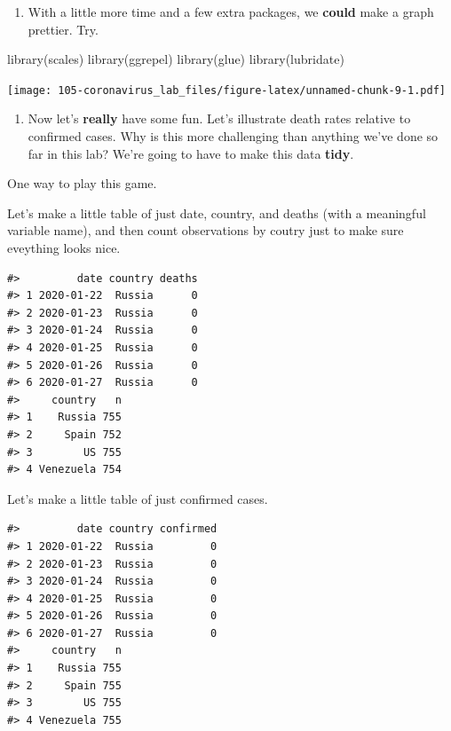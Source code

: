 \documentclass[
]{book}
\newenvironment{Shaded}{\begin{snugshade}}{\end{snugshade}}
\newcommand{\FunctionTok}[1]{\textcolor[rgb]{0.00,0.00,0.00}{#1}}
\newcommand{\NormalTok}[1]{#1}
\providecommand{\tightlist}{%
  \setlength{\itemsep}{0pt}\setlength{\parskip}{0pt}}
\begin{document}
\begin{enumerate}
\def\labelenumi{\arabic{enumi}.}
\setcounter{enumi}{5}
\tightlist
\item
  With a little more time and a few extra packages, we \textbf{could} make a graph prettier. Try.
\end{enumerate}

\begin{Shaded}
\begin{Highlighting}[]
\FunctionTok{library}\NormalTok{(scales)}
\FunctionTok{library}\NormalTok{(ggrepel)}
\FunctionTok{library}\NormalTok{(glue)}
\FunctionTok{library}\NormalTok{(lubridate)}
\end{Highlighting}
\end{Shaded}

\texttt{[image: 105-coronavirus\_lab\_files/figure-latex/unnamed-chunk-9-1.pdf]}

\begin{enumerate}
\def\labelenumi{\arabic{enumi}.}
\setcounter{enumi}{6}
\tightlist
\item
  Now let's \textbf{really} have some fun. Let's illustrate death rates relative to confirmed cases. Why is this more challenging than anything we've done so far in this lab? We're going to have to make this data \textbf{tidy}.
\end{enumerate}

One way to play this game.

Let's make a little table of just date, country, and deaths (with a meaningful variable name), and then count observations by coutry just to make sure eveything looks nice.

\begin{verbatim}
#>         date country deaths
#> 1 2020-01-22  Russia      0
#> 2 2020-01-23  Russia      0
#> 3 2020-01-24  Russia      0
#> 4 2020-01-25  Russia      0
#> 5 2020-01-26  Russia      0
#> 6 2020-01-27  Russia      0
#>     country   n
#> 1    Russia 755
#> 2     Spain 752
#> 3        US 755
#> 4 Venezuela 754
\end{verbatim}

Let's make a little table of just confirmed cases.

\begin{verbatim}
#>         date country confirmed
#> 1 2020-01-22  Russia         0
#> 2 2020-01-23  Russia         0
#> 3 2020-01-24  Russia         0
#> 4 2020-01-25  Russia         0
#> 5 2020-01-26  Russia         0
#> 6 2020-01-27  Russia         0
#>     country   n
#> 1    Russia 755
#> 2     Spain 755
#> 3        US 755
#> 4 Venezuela 755
\end{verbatim}
\end{document}
